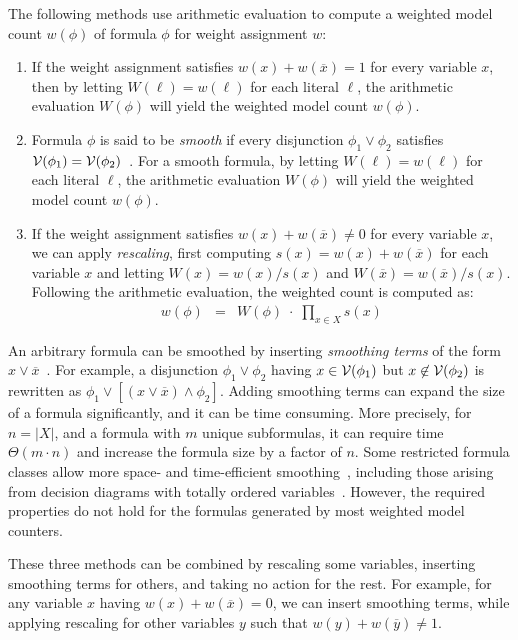 \documentclass{easychair}
\newcommand{\obar}[1]{\overline{#1}}
\newcommand{\lit}{\ell}
\newcommand{\varset}{X}
\newcommand{\dependencyset}{{\cal V}}
\begin{document}
The following methods use arithmetic evaluation to compute a weighted model count $w(\phi)$ of formula $\phi$ for weight assignment $w$:
\begin{enumerate}
\item If the weight assignment satisfies $w(x) + w(\obar{x}) = 1$  for every variable $x$,
  then by letting $W(\lit) = w(\lit)$ for each literal $\lit$, the arithmetic evaluation $W(\phi)$ will yield the weighted model count $w(\phi)$.
\item Formula $\phi$ is said to be \emph{smooth} if every disjunction $\phi_1 \lor \phi_2$ satisfies
  $\dependencyset(\phi_1) = \dependencyset(\phi_2)$~\cite{darwiche:jair:2002,darwiche:jancl:2001}.  For a smooth formula, 
by letting $W(\lit) = w(\lit)$ for each literal $\lit$, the arithmetic evaluation $W(\phi)$ will yield the weighted model count $w(\phi)$.
\item If the weight assignment satisfies $w(x) + w(\obar{x}) \not = 0$ for every variable $x$,
  we can apply \emph{rescaling}, first computing $s(x) = w(x) + w(\obar{x})$ for each variable $x$
  and letting $W(x) = w(x)/s(x)$ and $W(\obar{x}) = w(\obar{x})/s(x)$.  
  Following the arithmetic evaluation, the weighted count is computed as:
  \begin{eqnarray}
w(\phi) &=& W(\phi)\; \cdot \;  \prod_{x\in\varset} s(x)  \label{eqn:rescale}
  \end{eqnarray}
\end{enumerate}

An arbitrary formula can be smoothed by inserting \emph{smoothing terms} of the form $x \lor \obar{x}$~\cite{darwiche:jancl:2001}.
For example,
  a disjunction $\phi_1 \lor \phi_2$ having $x \in \dependencyset(\phi_1)$ but
  $x \not\in \dependencyset(\phi_2)$ is rewritten as $\phi_1 \lor [(x \lor \obar{x}) \land \phi_2]$.
  Adding smoothing terms can expand the size of a formula significantly, and it can be time consuming.
  More precisely, for $n = |X|$, and a formula with $m$ unique subformulas, it can require time $\Theta(m\cdot n)$ and increase the formula size by a factor of $n$.
  Some restricted formula classes allow more space- and time-efficient smoothing~\cite{shih:neurips:2019}, including those arising from decision
  diagrams with totally ordered variables~\cite{bryant:ieeetc:1986,minato:sttt:2001}.
  However, the required properties do not hold for the formulas generated by most weighted model counters.
  
  These three methods can be combined by rescaling some variables,
  inserting smoothing terms for others, and taking no action for the rest.
  For example,
  for any variable $x$ having $w(x) + w(\obar{x}) = 0$, we can insert
  smoothing terms, while applying rescaling for other variables $y$ such that $w(y) + w(\obar{y}) \not= 1$.
\end{document}
